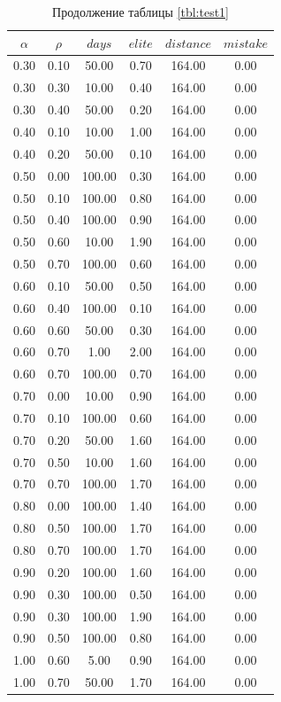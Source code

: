 \begin{table}
	\caption{Продолжение таблицы \ref{tbl:test1}\label{tbl:test1.1}}
	\begin{tabular}[c]{|c|c|c|c|c|c|}
        \hline
		$\alpha$ & $\rho$ & $days$ & $elite$ & $distance$ & $mistake$ \\
		\hline  
    0.30 & 0.10 & 50.00 & 0.70 & 164.00 & 0.00 \\
        0.30 & 0.30 & 10.00 & 0.40 & 164.00 & 0.00 \\
        0.30 & 0.40 & 50.00 & 0.20 & 164.00 & 0.00 \\
        0.40 & 0.10 & 10.00 & 1.00 & 164.00 & 0.00 \\
        0.40 & 0.20 & 50.00 & 0.10 & 164.00 & 0.00 \\
        0.50 & 0.00 & 100.00 & 0.30 & 164.00 & 0.00 \\
        0.50 & 0.10 & 100.00 & 0.80 & 164.00 & 0.00 \\
        0.50 & 0.40 & 100.00 & 0.90 & 164.00 & 0.00 \\
        0.50 & 0.60 & 10.00 & 1.90 & 164.00 & 0.00 \\
        0.50 & 0.70 & 100.00 & 0.60 & 164.00 & 0.00 \\
        0.60 & 0.10 & 50.00 & 0.50 & 164.00 & 0.00 \\
        0.60 & 0.40 & 100.00 & 0.10 & 164.00 & 0.00 \\
        0.60 & 0.60 & 50.00 & 0.30 & 164.00 & 0.00 \\
        0.60 & 0.70 & 1.00 & 2.00 & 164.00 & 0.00 \\
        0.60 & 0.70 & 100.00 & 0.70 & 164.00 & 0.00 \\
        0.70 & 0.00 & 10.00 & 0.90 & 164.00 & 0.00 \\
        0.70 & 0.10 & 100.00 & 0.60 & 164.00 & 0.00 \\
        0.70 & 0.20 & 50.00 & 1.60 & 164.00 & 0.00 \\
        0.70 & 0.50 & 10.00 & 1.60 & 164.00 & 0.00 \\
        0.70 & 0.70 & 100.00 & 1.70 & 164.00 & 0.00 \\
        0.80 & 0.00 & 100.00 & 1.40 & 164.00 & 0.00 \\
        0.80 & 0.50 & 100.00 & 1.70 & 164.00 & 0.00 \\
        0.80 & 0.70 & 100.00 & 1.70 & 164.00 & 0.00 \\
        0.90 & 0.20 & 100.00 & 1.60 & 164.00 & 0.00 \\
        0.90 & 0.30 & 100.00 & 0.50 & 164.00 & 0.00 \\
        0.90 & 0.30 & 100.00 & 1.90 & 164.00 & 0.00 \\
        0.90 & 0.50 & 100.00 & 0.80 & 164.00 & 0.00 \\
        1.00 & 0.60 & 5.00 & 0.90 & 164.00 & 0.00 \\
        1.00 & 0.70 & 50.00 & 1.70 & 164.00 & 0.00 \\ \hline
    \end{tabular}
\end{table}
\clearpage

